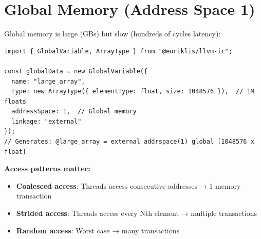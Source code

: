 \section{Global Memory (Address Space 1)}

Global memory is large (GBs) but slow (hundreds of cycles latency):

\begin{lstlisting}[style=ts]
import { GlobalVariable, ArrayType } from "@euriklis/llvm-ir";

const globalData = new GlobalVariable({
  name: "large_array",
  type: new ArrayType({ elementType: float, size: 1048576 }),  // 1M floats
  addressSpace: 1,  // Global memory
  linkage: "external"
});
// Generates: @large_array = external addrspace(1) global [1048576 x float]
\end{lstlisting}

\textbf{Access patterns matter:}
\begin{itemize}[noitemsep]
  \item \textbf{Coalesced access}: Threads access consecutive addresses → 1 memory transaction
  \item \textbf{Strided access}: Threads access every Nth element → multiple transactions
  \item \textbf{Random access}: Worst case → many transactions
\end{itemize}


